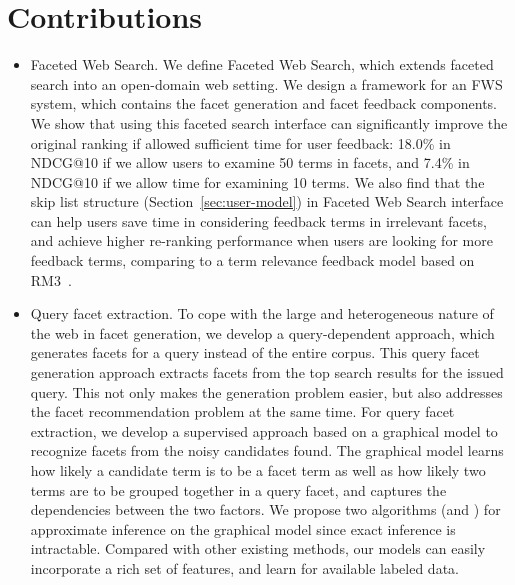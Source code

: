 \section{Contributions}
\label{sec:intro-contributions}
\begin{itemize}
 \item Faceted Web Search. We define Faceted Web Search, which extends faceted search into an open-domain web setting. We design a framework for an FWS system, which contains the facet generation and facet feedback components. We show that using this faceted search interface can significantly improve the original ranking if allowed sufficient time for user feedback: 18.0\% in NDCG@10 if we allow users to examine 50 terms in facets, and 7.4\% in NDCG@10 if we allow time for examining 10 terms. We also find that the skip list structure (Section~\ref{sec:user-model}) in Faceted Web Search interface can help users save time in considering feedback terms in irrelevant facets, and achieve higher re-ranking performance when users are looking for more feedback terms, comparing to a term relevance feedback model based on RM3~\cite{abdul2004umass,lavrenko2001relevance}.


 \item Query facet extraction. To cope with the large and heterogeneous nature of the web in facet generation, we develop a query-dependent approach, which generates facets for a query instead of the entire corpus. This query facet generation approach extracts facets from the top search results for the issued query. This not only makes the generation problem easier, but also addresses the facet recommendation problem at the same time. For query facet extraction, we develop a supervised approach based on a graphical model to recognize facets from the noisy candidates found. The graphical model learns how likely a candidate term is to be a facet term as well as how likely two terms are to be grouped together in a query facet, and captures the dependencies between the two factors. We propose two algorithms (\QFI and \QFJ) for approximate inference on the graphical model since exact inference is intractable. Compared with other existing methods, our models can easily incorporate a rich set of features, and learn for available labeled data.


\end{itemize}
